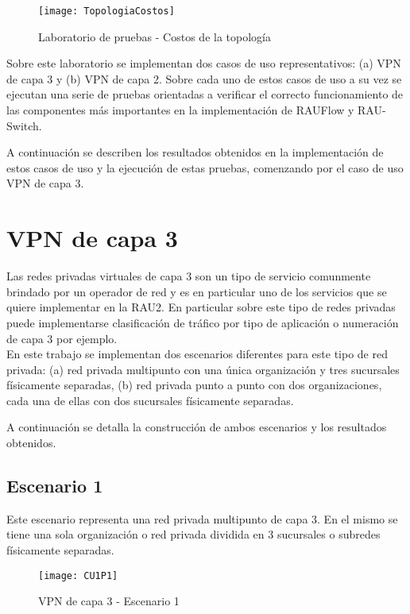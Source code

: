 \begin{figure}[ht!] 
\centering    
\texttt{[image: TopologiaCostos]}
\caption[Laboratorio de pruebas - Costos de la topolog\'ia]{Laboratorio de pruebas - Costos de la topolog\'ia}
\label{fig:LaboratorioDePruebasCostos}
\end{figure}

Sobre este laboratorio se implementan dos casos de uso representativos: (a) VPN de capa 3 y (b) VPN de capa 2. Sobre cada uno de estos casos de uso a su vez se ejecutan una serie de pruebas orientadas a verificar el correcto funcionamiento de las componentes m\'as importantes en la implementaci\'on de RAUFlow y RAU-Switch.

A continuaci\'on se describen los resultados obtenidos en la implementaci\'on de estos casos de uso y la ejecuci\'on de estas pruebas, comenzando por el caso de uso VPN de capa 3.

\section{VPN de capa 3}

Las redes privadas virtuales de capa 3 son un tipo de servicio comunmente brindado por un operador de red y es en particular uno de los servicios que se quiere implementar en la RAU2. En particular sobre este tipo de redes privadas puede implementarse clasificaci\'on de tr\'afico por tipo de aplicaci\'on o numeraci\'on de capa 3 por ejemplo.\\

En este trabajo se implementan dos escenarios diferentes para este tipo de red privada: (a) red privada multipunto con una \'unica organizaci\'on y tres sucursales f\'isicamente separadas, (b) red privada punto a punto con dos organizaciones, cada una de ellas con dos sucursales f\'isicamente separadas.

A continuaci\'on se detalla la construcci\'on de ambos escenarios y los resultados obtenidos.

\subsection{Escenario 1}

Este escenario representa una red privada multipunto de capa 3. En el mismo se tiene una sola organizaci\'on o red privada dividida en 3 sucursales o subredes físicamente separadas.

\begin{figure}[ht!] 
\centering    
\texttt{[image: CU1P1]}
\caption[VPN de capa 3 - Escenario 1]{VPN de capa 3 - Escenario 1}
\label{fig:CUP1}
\end{figure}

